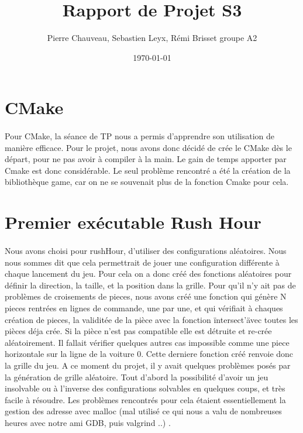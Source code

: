 \documentclass {article}
\title{Rapport de Projet S3}
\date\today
\author{Pierre Chauveau, Sebastien Leyx, Rémi Brisset groupe A2}
\begin{document}
\maketitle
\section{CMake}
\paragraph{}
Pour CMake, la séance de TP nous a permis d'apprendre son utilisation de manière efficace. Pour le projet, nous avons donc décidé de crée le CMake dès le départ, pour ne pas avoir à compiler à la main. Le gain de temps apporter par Cmake est donc considérable. Le seul problème rencontré a été la création de la bibliothèque game, car on ne se souvenait plus de la fonction Cmake pour cela. 

\section{Premier exécutable Rush Hour}
\paragraph{}
Nous avons choisi pour rushHour, d'utiliser des configurations aléatoires. Nous nous sommes dit que cela permettrait de jouer une configuration différente à chaque lancement du jeu. Pour cela on a donc créé des fonctions aléatoires pour définir la direction, la taille, et la position dans la grille. Pour qu'il n'y ait pas de problèmes de croisements de pieces, nous avons créé une fonction qui génère N pieces rentrées en lignes de commande, une par une, et qui vérifiait à chaques création de pieces, la validitée de la pièce avec la fonction \"intersect'\" avec toutes les pièces déja crée. Si la pièce n'est pas compatible elle est détruite et re-crée aléatoirement. Il fallait vérifier quelques autres cas impossible comme une piece horizontale sur la ligne de la voiture 0. Cette derniere fonction créé renvoie donc la grille du jeu. A ce moment du projet, il y avait quelques problèmes posés par la génération de grille aléatoire. Tout d'abord la possibilité d'avoir un jeu insolvable ou à l'inverse des configurations solvables en quelques coups, et très facile à résoudre. Les problèmes rencontrés pour cela étaient essentiellement la gestion des adresse avec malloc (mal utilisé ce qui nous a valu de nombreuses heures avec notre ami GDB, puis valgrind ..) .
\smallskip
\end{document}
